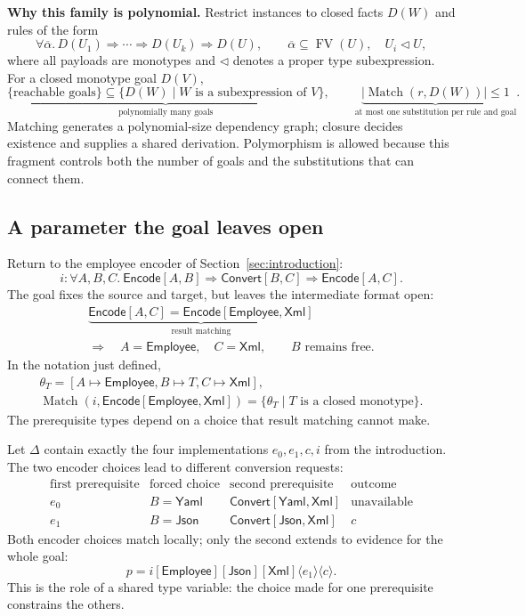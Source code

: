 \documentclass[10pt,a4paper]{article}
\newcommand{\iarg}[1]{\langle#1\rangle}
\newcommand{\kw}[1]{\mathsf{#1}}
\begin{document}
\textbf{Why this family is polynomial.}
Restrict instances to closed facts $D(W)$ and rules of the form
\[
 \forall\overline\alpha.\,
 D(U_1)\Rightarrow\cdots\Rightarrow D(U_k)\Rightarrow D(U),
 \qquad
 \overline\alpha\subseteq\operatorname{FV}(U),\quad U_i\triangleleft U,
\]
where all payloads are monotypes and $\triangleleft$ denotes a proper type
subexpression. For a closed monotype goal $D(V)$,
\[
 \underbrace{\{\text{reachable goals}\}\subseteq
   \{D(W)\mid W\text{ is a subexpression of }V\}}_{\text{polynomially many goals}},
 \qquad
 \underbrace{|\operatorname{Match}(r,D(W))|\leq1}_{\text{at most one substitution per rule and goal}}.
\]
Matching generates a polynomial-size dependency graph; closure decides existence
and supplies a shared derivation. Polymorphism is allowed because this fragment
controls both the number of goals and the substitutions that can connect them.

\newpage
\subsection{A parameter the goal leaves open}
\label{sec:synthesis-hardness}
Return to the employee encoder of Section~\ref{sec:introduction}:
\[
 i:\forall A,B,C.\ \kw{Encode}[A,B]\Rightarrow\kw{Convert}[B,C]
                   \Rightarrow\kw{Encode}[A,C].
\]
The goal fixes the source and target, but leaves the intermediate format open:
\[
\begin{gathered}
 \underbrace{\kw{Encode}[A,C]=\kw{Encode}[\kw{Employee},\kw{Xml}]}_{\text{result matching}}\\
 \Longrightarrow\quad A=\kw{Employee},\quad C=\kw{Xml},\qquad
 \boxed{B\text{ remains free}.}
\end{gathered}
\]
In the notation just defined,
\[
\begin{gathered}
 \theta_T=[A\mapsto\kw{Employee},B\mapsto T,C\mapsto\kw{Xml}],\\
 \operatorname{Match}(i,\kw{Encode}[\kw{Employee},\kw{Xml}])
   =\{\theta_T\mid T\text{ is a closed monotype}\}.
\end{gathered}
\]
The prerequisite types depend on a choice that result matching cannot make.

Let $\Delta$ contain exactly the four implementations $e_0,e_1,c,i$ from the
introduction. The two encoder choices lead to different conversion requests:
\[
\begin{array}{c|c|c|c}
 \text{first prerequisite} & \text{forced choice} & \text{second prerequisite} & \text{outcome}\\ \hline
 e_0 & B=\kw{Yaml} & \kw{Convert}[\kw{Yaml},\kw{Xml}] & \text{unavailable}\\
 e_1 & B=\kw{Json} & \kw{Convert}[\kw{Json},\kw{Xml}] & c
\end{array}
\]
Both encoder choices match locally; only the second extends to evidence
for the whole goal:
\[
 p=i[\kw{Employee}][\kw{Json}][\kw{Xml}]\iarg{e_1}\iarg{c}.
\]
This is the role of a shared type variable: the choice made for one prerequisite
constrains the others.
\end{document}

